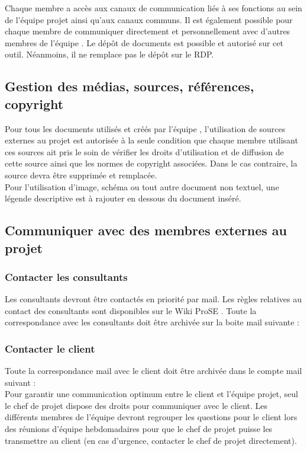 \documentclass[a4paper,11pt,titlepage]{article}
\begin{document}
Chaque membre a accès aux canaux de communication liés à ses fonctions au
sein de l'équipe projet ainsi qu'aux canaux communs. Il est également possible
pour chaque membre de communiquer directement et personnellement avec
d'autres membres de l'équipe \teamNumber.
Le dépôt de documents est possible et autorisé sur cet outil. Néanmoins, il ne
remplace pas le dépôt sur le RDP.

\subsection{Gestion des médias, sources, références, copyright}
Pour tous les documents utilisés et créés par l'équipe \teamNumber, l'utilisation
de sources externes au projet est autorisée à la seule condition que chaque
membre utilisant ces sources ait pris le soin de vérifier les droits
d'utilisation et de diffusion de cette source ainsi que les normes de
copyright associées. Dans le cas contraire, la source devra être
supprimée et remplacée. \\

Pour l'utilisation d'image, schéma ou tout autre document non textuel, une
légende descriptive est à rajouter en dessous du document inséré. \\


\subsection{Communiquer avec des membres externes au projet}
\subsubsection{Contacter les consultants}
Les consultants devront être contactés en priorité par mail. Les règles relatives au 
contact des consultants sont disponibles sur le Wiki ProSE \cite[Wiki ProSE]{WIKI}. 
Toute la correspondance avec les consultants doit être archivée sur la boite mail suivante : {\teamMail} \\

\subsubsection{Contacter le client}
Toute la correspondance mail avec le client doit être archivée dans le compte mail suivant  : {\teamMail} \\

Pour garantir une communication optimum entre le client et l'équipe projet,
seul le chef de projet dispose des droits pour communiquer avec le client.
Les différents membres de l'équipe devront regrouper les questions pour le
client lors des réunions d'équipe hebdomadaires pour que le chef de projet
puisse les transmettre au client (en cas d'urgence, contacter le chef de
projet directement).\\
\end{document}

